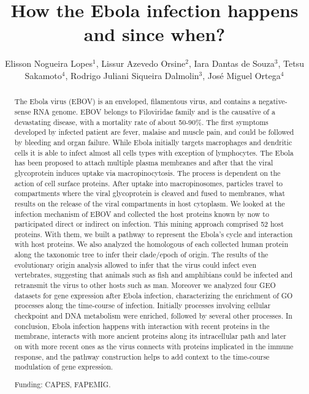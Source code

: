 \documentclass[twoside]{article}
\title{\vspace{-15mm}\fontsize{24pt}{10pt}\selectfont\textbf{How the Ebola infection happens and since when?}} %
\author{Elisson Nogueira Lopes$^1$, Lissur Azevedo Orsine$^2$, Iara Dantas de Souza$^3$, Tetsu Sakamoto$^4$, Rodrigo Juliani Siqueira Dalmolin$^3$, Jos\'e Miguel Ortega$^4$}
\affil{1 UFMG\\ 2 UFRN\\ 3 UFMG. LABORAT\'ORIO DE BIODADOS.\\ }
\date{}
\begin{document}
\maketitle %

\thispagestyle{fancy} %


\begin{abstract}
The Ebola virus (EBOV) is an enveloped, filamentous virus, and contains a negative-sense RNA genome. EBOV belongs to Filoviridae family and is the causative of a devastating disease, with a mortality rate of about 50-90\%. The first symptoms developed by infected patient are fever, malaise and muscle pain, and could be followed by bleeding and organ failure. While Ebola initially targets macrophages and dendritic cells it is able to infect almost all cells types with exception of lymphocytes. The Ebola has been proposed to attach multiple plasma membranes and after that the viral glycoprotein induces uptake via macropinocytosis. The process is dependent on the action of cell surface proteins. After uptake into macropinosomes, particles travel to compartments where the viral glycoprotein is cleaved and fused to membranes, what results on the release of the viral compartments in host cytoplasm. We looked at the infection mechanism of EBOV and collected the host proteins known by now to participated direct or indirect on infection. This mining approach comprised 52 host proteins. With them, we built a pathway to represent the Ebola's cycle and interaction with host proteins. We also analyzed the homologous of each collected human protein along the taxonomic tree to infer their clade/epoch of origin. The results of the evolutionary origin analysis allowed to infer that the virus could infect even vertebrates, suggesting that animals such as fish and amphibians could be infected and retransmit the virus to other hosts such as man. Moreover we analyzed four GEO datasets for gene expression after Ebola infection, characterizing the enrichment of GO processes along the time-course of infection. Initially processes involving cellular checkpoint and DNA metabolism were enriched, followed by several other processes. In conclusion, Ebola infection happens with interaction with recent proteins in the membrane, interacts with more ancient proteins along its intracellular path and later on with more recent ones as the virus connects with proteins implicated in the immune response, and the pathway construction helps to add context to the time-course modulation of gene expression.

Funding: CAPES, FAPEMIG.
\end{abstract}
\end{document}
